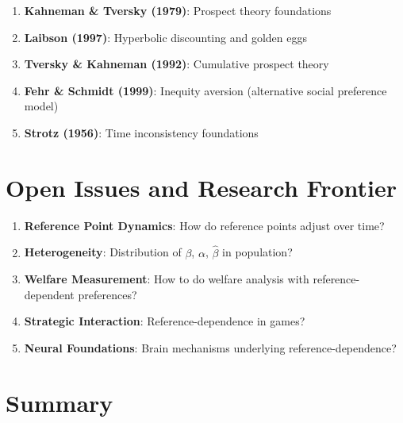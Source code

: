 \begin{tcolorbox}[colback=orange!5!white,colframe=orange!75!black,title=Critical Foundations]
\begin{enumerate}
    \item \textbf{Kahneman \& Tversky (1979)}: Prospect theory foundations
    \item \textbf{Laibson (1997)}: Hyperbolic discounting and golden eggs
    \item \textbf{Tversky \& Kahneman (1992)}: Cumulative prospect theory
    \item \textbf{Fehr \& Schmidt (1999)}: Inequity aversion (alternative social preference model)
    \item \textbf{Strotz (1956)}: Time inconsistency foundations
\end{enumerate}
\end{tcolorbox}

\section{Open Issues and Research Frontier}

\begin{enumerate}
    \item \textbf{Reference Point Dynamics}: How do reference points adjust over time?
    \item \textbf{Heterogeneity}: Distribution of $\beta$, $\alpha$, $\hat{\beta}$ in population?
    \item \textbf{Welfare Measurement}: How to do welfare analysis with reference-dependent preferences?
    \item \textbf{Strategic Interaction}: Reference-dependence in games?
    \item \textbf{Neural Foundations}: Brain mechanisms underlying reference-dependence?
\end{enumerate}

\section{Summary}

